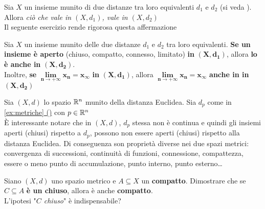 \begin{observation}
	Sia $X$ un insieme munito di due distanze tra loro equivalenti $d_1$ e $d_2$ (si veda ). Allora \textit{ciò che vale in $(X, d_1)$, vale in $(X, d_2)$}\\
	Il seguente esercizio rende rigorosa questa affermazione
\end{observation}
\begin{exercise}
	\label{ex:dist_eqiv}
	Sia $X$ un insieme munito delle due distanze $d_1$ e $d_2$ tra loro equivalenti. \textbf{Se un insieme è aperto} (chiuso, compatto, connesso, limitato) \textbf{in} $\boldsymbol{(X,d_1)}$, allora \textbf{lo è anche in} $\boldsymbol{(X,d_2)}$.\\
	Inoltre, \textbf{se} $\boldsymbol{\lim\limits_{n \to +\infty} x_n = x_\infty}$ \textbf{in} $\boldsymbol{(X,d_1)}$, allora $\boldsymbol{\lim\limits_{n \to +\infty} x_n = x_\infty}$ \textbf{anche in in} $\boldsymbol{(X,d_2)}$
\end{exercise}
\begin{example}
	Sia $(X,d)$ lo spazio $\mathbb{R}^n$ munito della distanza Euclidea. Sia $d_p$ come in \hyperref[ex:dist_parigi]{\cref*{ex:metriche} ()} con $p \in \mathbb{R}^n$\\
	È interessante notare che in $(X,d)$, $d_p$ stessa non è continua e quindi gli insiemi aperti (chiusi) rispetto a $d_p$, possono non essere aperti (chiusi) rispetto alla distanza Euclidea. Di conseguenza son proprietà diverse nei due spazi metrici: convergenza di successioni, continuità di funzioni, connessione, compattezza, essere o meno punto di accumulazione, punto interno, punto esterno\dots
\end{example}
\begin{exercise}
	Siano $(X,d)$ uno spazio metrico e $A \subseteq X$ un \textbf{compatto}. Dimostrare che se $C \subseteq A$ \textbf{è un chiuso}, allora è anche \textbf{compatto}.\\
	L'ipotesi "\textit{$C$ chiuso}" è indispensabile? 
\end{exercise}

